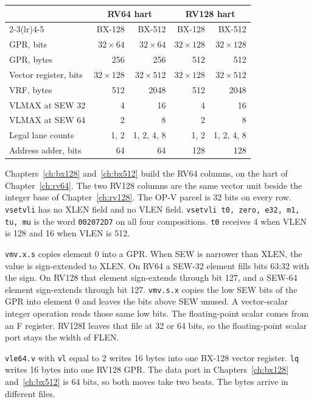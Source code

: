 \begin{center}
\begingroup
\scriptsize
\setlength{\tabcolsep}{5pt}
\begin{tabular}{@{}lrrrr@{}}
\toprule
 & \multicolumn{2}{c}{RV64 hart} & \multicolumn{2}{c}{RV128 hart} \\
\cmidrule(lr){2-3}\cmidrule(lr){4-5}
 & BX-128 & BX-512 & BX-128 & BX-512 \\
\midrule
GPR, bits & $32\times 64$ & $32\times 64$ & $32\times 128$ & $32\times 128$ \\
GPR, bytes & 256 & 256 & 512 & 512 \\
Vector register, bits & $32\times 128$ & $32\times 512$ & $32\times 128$ & $32\times 512$ \\
VRF, bytes & 512 & 2048 & 512 & 2048 \\
VLMAX at SEW 32 & 4 & 16 & 4 & 16 \\
VLMAX at SEW 64 & 2 & 8 & 2 & 8 \\
Legal lane counts & 1, 2 & 1, 2, 4, 8 & 1, 2 & 1, 2, 4, 8 \\
Address adder, bits & 64 & 64 & 128 & 128 \\
\bottomrule
\end{tabular}
\endgroup
\end{center}

Chapters~\ref{ch:bx128} and~\ref{ch:bx512} build the RV64 columns, on the hart of Chapter~\ref{ch:rv64}. The two RV128 columns are the same vector unit beside the integer base of Chapter~\ref{ch:rv128}. The OP-V parcel is 32 bits on every row. \texttt{vsetvli} has no XLEN field and no VLEN field. \texttt{vsetvli t0, zero, e32, m1, tu, mu} is the word \texttt{002072D7} on all four compositions. \texttt{t0} receives 4 when VLEN is 128 and 16 when VLEN is 512.

\texttt{vmv.x.s} copies element 0 into a GPR. When SEW is narrower than XLEN, the value is sign-extended to XLEN. On RV64 a SEW-32 element fills bits 63:32 with the sign. On RV128 that element sign-extends through bit 127, and a SEW-64 element sign-extends through bit 127. \texttt{vmv.s.x} copies the low SEW bits of the GPR into element 0 and leaves the bits above SEW unused. A vector-scalar integer operation reads those same low bits. The floating-point scalar comes from an F register. RV128I leaves that file at 32 or 64 bits, so the floating-point scalar port stays the width of FLEN.

\texttt{vle64.v} with \texttt{vl} equal to 2 writes 16 bytes into one BX-128 vector register. \texttt{lq} writes 16 bytes into one RV128 GPR. The data port in Chapters~\ref{ch:bx128} and~\ref{ch:bx512} is 64 bits, so both moves take two beats. The bytes arrive in different files.

